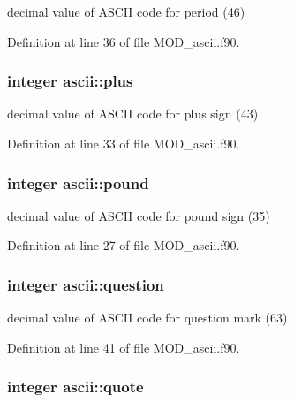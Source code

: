 decimal value of A\-S\-C\-I\-I code for period (46) 



Definition at line 36 of file M\-O\-D\-\_\-ascii.\-f90.

\hypertarget{classascii_acbf5e3e62cf649d5d76cadb8d9684a34}{
\subsubsection[{plus}]{\setlength{\rightskip}{0pt plus 5cm}integer ascii\-::plus}}\label{classascii_acbf5e3e62cf649d5d76cadb8d9684a34}


decimal value of A\-S\-C\-I\-I code for plus sign (43) 



Definition at line 33 of file M\-O\-D\-\_\-ascii.\-f90.

\hypertarget{classascii_ad5f296b38407b7996fdb4bccc12c416e}{
\subsubsection[{pound}]{\setlength{\rightskip}{0pt plus 5cm}integer ascii\-::pound}}\label{classascii_ad5f296b38407b7996fdb4bccc12c416e}


decimal value of A\-S\-C\-I\-I code for pound sign (35) 



Definition at line 27 of file M\-O\-D\-\_\-ascii.\-f90.

\hypertarget{classascii_aec590b3fdb4d5c80d8cb2c8e2423f81a}{
\subsubsection[{question}]{\setlength{\rightskip}{0pt plus 5cm}integer ascii\-::question}}\label{classascii_aec590b3fdb4d5c80d8cb2c8e2423f81a}


decimal value of A\-S\-C\-I\-I code for question mark (63) 



Definition at line 41 of file M\-O\-D\-\_\-ascii.\-f90.

\hypertarget{classascii_a85a2d9bbeb7696015eb149345012ac0d}{
\subsubsection[{quote}]{\setlength{\rightskip}{0pt plus 5cm}integer ascii\-::quote}}\label{classascii_a85a2d9bbeb7696015eb149345012ac0d}


